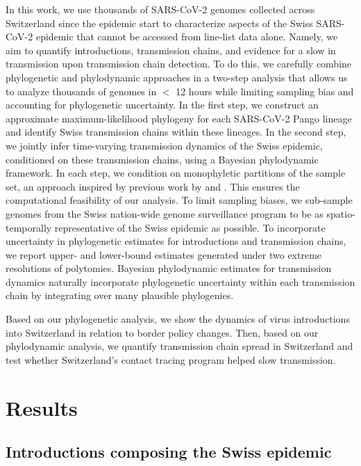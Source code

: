 \documentclass[9pt,twocolumn,twoside,lineno]{pnas-new}
\begin{document}
In this work, we use thousands of SARS-CoV-2 genomes collected across Switzerland since the epidemic start to characterize aspects of the Swiss SARS-CoV-2 epidemic that cannot be accessed from line-list data alone. Namely, we aim to quantify introductions, transmission chains, and evidence for a slow in transmission upon transmission chain detection. To do this, we carefully combine phylogenetic and phylodynamic approaches in a two-step analysis that allows us to analyze thousands of genomes in $<$ 12 hours while limiting sampling bias and accounting for phylogenetic uncertainty. In the first step, we construct an approximate maximum-likelihood phylogeny for each SARS-CoV-2 Pango lineage and identify Swiss transmission chains within these lineages. In the second step, we jointly infer time-varying transmission dynamics of the Swiss epidemic, conditioned on these transmission chains, using a Bayesian phylodynamic framework. In each step, we condition on monophyletic partitions of the sample set, an approach inspired by previous work by \cite{DuPlessis} and \cite{Muller2020}. This ensures the computational feasibility of our analysis. To limit sampling biases, we sub-sample genomes from the Swiss nation-wide genome surveillance program to be as spatio-temporally representative of the Swiss epidemic as possible. To incorporate uncertainty in phylogenetic estimates for introductions and transmission chains, we report upper- and lower-bound estimates generated under two extreme resolutions of polytomies. Bayesian phylodynamic estimates for transmission dynamics naturally incorporate phylogenetic uncertainty within each transmission chain by integrating over many plausible phylogenies.

Based on our phylogenetic analysis, we show the dynamics of virus introductions into Switzerland in relation to border policy changes. Then, based on our phylodynamic analysis, we quantify transmission chain spread in Switzerland and test whether Switzerland’s contact tracing program helped slow transmission.

\section{Results}

\subsection{Introductions composing the Swiss epidemic}
\end{document}
